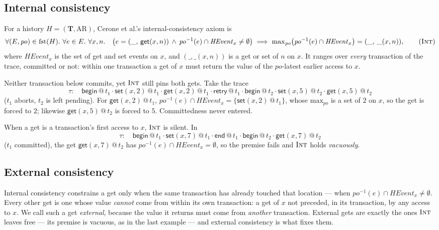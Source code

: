 \documentclass[manuscript,nonacm]{acmart}
\makeatletter
\theoremstyle{acmdefinition}
\newcommand{\bbegin}{\textsf{begin}}
\newcommand{\eend}{\textsf{end}}
\newcommand{\retry}{\textsf{retry}}
\newcommand{\getev}[3]{\textsf{get}(#1,#2)\,@\,#3}
\newcommand{\setev}[3]{\textsf{set}(#1,#2)\,@\,#3}
\newcommand{\HEvent}{\mathit{HEvent}}
\newcommand{\rdev}[2]{\mathsf{get}(#1,#2)}   %
\newcommand{\po}{\mathit{po}}
\newcommand{\maxpo}{\mathrm{max}_{\po}}
\newcommand{\anyop}[2]{\mathord{\_}(#1,#2)} %
\newcommand{\fst}{\mathrm{fst}}             %
\makeatother
\begin{document}
\subsection{Internal consistency}
\label{sec:int}

For a history $H = (\mathbf{T}, \mathrm{AR})$, Cerone et al.'s internal-consistency
axiom is
\[
\forall (E, \po) \in \fst(H).\ \forall e \in E.\ \forall x, n.\quad
\bigl(e = (\_,\, \rdev{x}{n}) \,\wedge\, \po^{-1}(e) \cap \HEvent_x \neq \emptyset\bigr)
\implies
\maxpo\bigl(\po^{-1}(e) \cap \HEvent_x\bigr) = (\_,\, \anyop{x}{n}),
\tag{\textsc{Int}}
\]
where $\HEvent_x$ is the set of get and set events on $x$, and
$(\_,\anyop{x}{n})$ is a get or set of $n$ on $x$. It ranges over \emph{every}
transaction of the trace, committed or not: within one transaction a get of $x$
must return the value of the $\po$-latest earlier access to $x$.

\begin{example}
Neither transaction below commits, yet $\textsc{Int}$ still pins both gets. Take
the trace
\[
\tau:\quad \bbegin\,@\,t_1 \cdot \setev{x}{2}{t_1} \cdot \getev{x}{2}{t_1} \cdot \retry\,@\,t_1
      \cdot \bbegin\,@\,t_2 \cdot \setev{x}{5}{t_2} \cdot \getev{x}{5}{t_2}
\]
($t_1$ aborts, $t_2$ is left pending). For $\getev{x}{2}{t_1}$,
$\po^{-1}(e)\cap\HEvent_x = \{\setev{x}{2}{t_1}\}$, whose $\maxpo$ is a set of $2$
on $x$, so the get is forced to $2$; likewise $\getev{x}{5}{t_2}$ is forced to
$5$. Committedness never entered.
\end{example}

\begin{example}
When a get is a transaction's first access to $x$, $\textsc{Int}$ is silent. In
\[
\tau:\quad \bbegin\,@\,t_1 \cdot \setev{x}{7}{t_1} \cdot \eend\,@\,t_1
      \cdot \bbegin\,@\,t_2 \cdot \getev{x}{7}{t_2}
\]
($t_1$ committed), the get $\getev{x}{7}{t_2}$ has
$\po^{-1}(e)\cap\HEvent_x = \emptyset$, so the premise fails and $\textsc{Int}$
holds \emph{vacuously}.
\end{example}

\subsection{External consistency}
\label{sec:ext}

Internal consistency constrains a get only when the same transaction has already
touched that location --- when $\po^{-1}(e) \cap \HEvent_x \neq \emptyset$. Every
other get is one whose value \emph{cannot} come from within its own transaction: a
get of $x$ not preceded, in its transaction, by any access to $x$. We call such a
get \emph{external}, because the value it returns must come from \emph{another}
transaction. External gets are exactly the ones $\textsc{Int}$ leaves free --- its
premise is vacuous, as in the last example --- and external consistency is what
fixes them.
\end{document}
